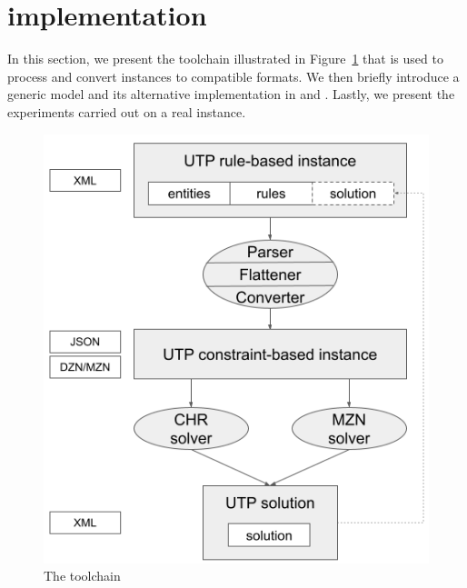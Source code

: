 \section{{\UTP} implementation}
\label{sec:model_implementation}


In this section, we present the toolchain illustrated in Figure~\ref{fig:toolchain} that is used to process and convert \UTP{} instances to \CP{} compatible formats. We then briefly introduce a generic \CP{} model and its alternative implementation in \MINIZINC{} \cite{MZN} and \CHR{} \cite{Fruhwirth_TechReport_92,Fruhwirth_CP_94,Fruhwirth_JLP_98,Fruhwirth_CHR_09,Fruhwirth_Abdennadher_CHR_03,Fruhwirth_Raiser_2011}. Lastly, we present the experiments carried out on a real instance.

\begin{figure}
    \centering
    \includegraphics[width=\columnwidth]{2022_APIA/img/utp_toolchain.png}
    \caption{The \UTP{} toolchain}
    \label{fig:toolchain}
\end{figure}

